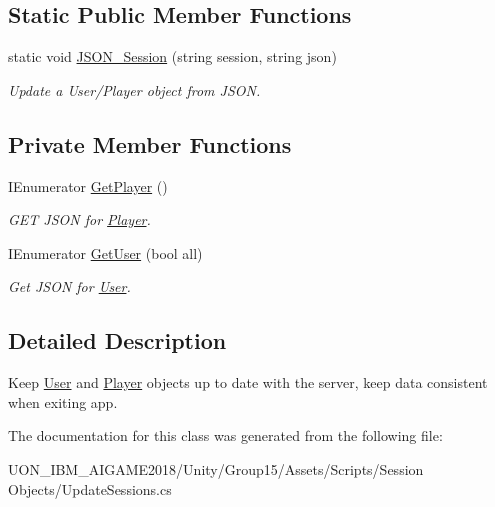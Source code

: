 \subsection*{Static Public Member Functions}
\begin{DoxyCompactItemize}
\item 
\mbox{\label{class_update_sessions_a841ee986ab762d64af283c9ba009c23d}} 
static void \mbox{\hyperlink{class_update_sessions_a841ee986ab762d64af283c9ba009c23d}{J\+S\+O\+N\+\_\+\+Session}} (string session, string json)
\begin{DoxyCompactList}\small\item\em Update a User/\+Player object from J\+S\+ON. \end{DoxyCompactList}\end{DoxyCompactItemize}
\subsection*{Private Member Functions}
\begin{DoxyCompactItemize}
\item 
\mbox{\label{class_update_sessions_a2a73c7d01b39317eab0b06a3ddfb9669}} 
I\+Enumerator \mbox{\hyperlink{class_update_sessions_a2a73c7d01b39317eab0b06a3ddfb9669}{Get\+Player}} ()
\begin{DoxyCompactList}\small\item\em G\+ET J\+S\+ON for \mbox{\hyperlink{class_player}{Player}}. \end{DoxyCompactList}\item 
\mbox{\label{class_update_sessions_a0d9f725dd5bd780272f19531fcc2c523}} 
I\+Enumerator \mbox{\hyperlink{class_update_sessions_a0d9f725dd5bd780272f19531fcc2c523}{Get\+User}} (bool all)
\begin{DoxyCompactList}\small\item\em Get J\+S\+ON for \mbox{\hyperlink{class_user}{User}}. \end{DoxyCompactList}\end{DoxyCompactItemize}


\subsection{Detailed Description}
Keep \mbox{\hyperlink{class_user}{User}} and \mbox{\hyperlink{class_player}{Player}} objects up to date with the server, keep data consistent when exiting app. 

The documentation for this class was generated from the following file\+:\begin{DoxyCompactItemize}
\item 
U\+O\+N\+\_\+\+I\+B\+M\+\_\+\+A\+I\+G\+A\+M\+E2018/\+Unity/\+Group15/\+Assets/\+Scripts/\+Session Objects/Update\+Sessions.\+cs\end{DoxyCompactItemize}
